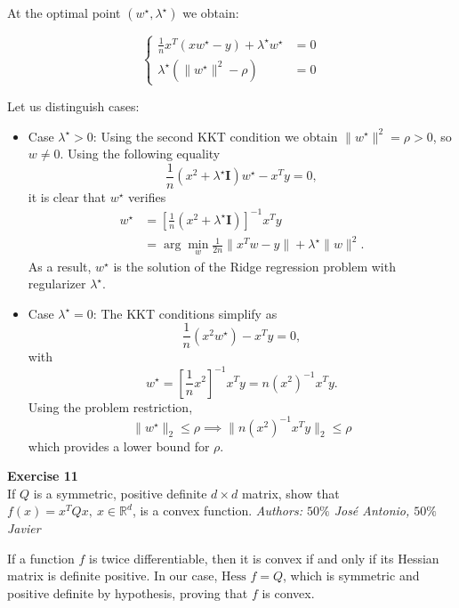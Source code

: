 \documentclass[11pt,table]{article}
\newenvironment{problem}[2][Exercise]
{ \begin{mdframed}[backgroundcolor=gray!20] \textbf{#1 #2} \\}
	{\hspace{0.0cm}\newline\newline \emph{Authors: \(50\%\) José Antonio, \(50\%\) Javier}  \end{mdframed}}
\begin{document}
At the optimal point $(w^\star, \lambda^\star)$ we obtain:

\begin{equation}
	\label{eq10}
	\begin{cases}
		\frac{1}{n}x^T(xw^\star - y) + \lambda^\star w^\star            & = 0 \\
		\lambda^\star \left(\parallel w^\star \parallel^2 - \rho\right) & = 0
	\end{cases}
\end{equation}

Let us distinguish cases:

\begin{itemize}
	\item Case $\lambda^\star > 0$: Using the second KKT condition we obtain \(\|w^\star\|^2 = \rho > 0\), so \(w \neq 0\).
	      Using the following equality
	      \[
		      \frac{1}{n} (x^2 + \lambda^\star \bm{I})w^\star - x^Ty = 0,
	      \]
	      it is clear that \(w^\star\) verifies
	      \[\begin{aligned}
			      w^\star & = \left[ \frac{1}{n} (x^2 + \lambda^\star \bm{I})\right]^{-1}x^T y  \\
			              & = \arg \min_{w} \frac{1}{2n} \|x^T w - y\| + \lambda^\star \|w\|^2.
		      \end{aligned}\]
	      As a result, \(w^\star\) is the solution of the Ridge regression problem with regularizer \(\lambda^\star\).
	\item Case \(\lambda^\star = 0\): The KKT conditions simplify as
	      \[
		      \frac{1}{n} \left(x^2w^\star\right) - x^Ty = 0,
	      \]
	      with
	      \[
		      w^\star = \left[ \frac{1}{n} x^2\right]^{-1}x^T y = n(x^2)^{-1} x^Ty.
	      \]
	      Using the problem restriction,
	      \[
		      \|w^\star\|_2 \leq \rho \implies \| n(x^2)^{-1} x^T y\|_2 \leq \rho
	      \]
	      which provides a lower bound for $\rho$. \\
\end{itemize}



\begin{problem}{11}
If \( Q \) is a symmetric, positive definite \( d \times d \) matrix, show that \( f(x) = x^TQx, \ x \in \mathbb{R}^d \), is a convex function.
\end{problem}

If a function $f$ is twice differentiable, then it is convex if and only if its Hessian matrix is definite positive. In our case, $\text{Hess }f = Q$, which is symmetric and positive definite by hypothesis, proving that $f$ is convex. \\
\end{document}
